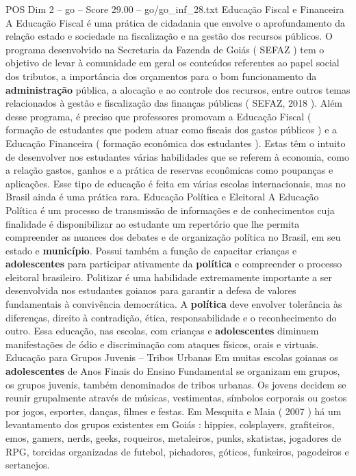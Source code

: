 \begin{textsample}{POS Dim 2 – go – Score 29.00 – go/go\_inf\_28.txt}
Educação Fiscal e Financeira A Educação Fiscal é uma prática de cidadania que envolve o aprofundamento da relação estado e sociedade na fiscalização e na gestão dos recursos públicos.
O programa desenvolvido na Secretaria da Fazenda de Goiás ( SEFAZ ) tem o objetivo de levar à comunidade em geral os conteúdos referentes ao papel social dos tributos, a importância dos orçamentos para o bom funcionamento da \textbf{administração} pública, a alocação e ao controle dos recursos, entre outros temas relacionados à gestão e fiscalização das finanças públicas ( SEFAZ, 2018 ).
Além desse programa, é preciso que professores promovam a Educação Fiscal ( formação de estudantes que podem atuar como fiscais dos gastos públicos ) e a Educação Financeira ( formação econômica dos estudantes ).
Estas têm o intuito de desenvolver nos estudantes várias habilidades que se referem à economia, como a relação gastos, ganhos e a prática de reservas econômicas como poupanças e aplicações.
Esse tipo de educação é feita em várias escolas internacionais, mas no Brasil ainda é uma prática rara.
Educação Política e Eleitoral A Educação Política é um processo de transmissão de informações e de conhecimentos cuja finalidade é disponibilizar ao estudante um repertório que lhe permita compreender as nuances dos debates e de organização política no Brasil, em seu estado e \textbf{município}.
Possui também a função de capacitar crianças e \textbf{adolescentes} para participar ativamente da \textbf{política} e compreender o processo eleitoral brasileiro.
Politizar é uma habilidade extremamente importante a ser desenvolvida nos estudantes goianos para garantir a defesa de valores fundamentais à convivência democrática.
A \textbf{política} deve envolver tolerância às diferenças, direito à contradição, ética, responsabilidade e o reconhecimento do outro.
Essa educação, nas escolas, com crianças e \textbf{adolescentes} diminuem manifestações de ódio e discriminação com ataques físicos, orais e virtuais.
Educação para Grupos Juvenis – Tribos Urbanas Em muitas escolas goianas os \textbf{adolescentes} de Anos Finais do Ensino Fundamental se organizam em grupos, os grupos juvenis, também denominados de tribos urbanas.
Os jovens decidem se reunir grupalmente através de músicas, vestimentas, símbolos corporais ou gostos por jogos, esportes, danças, filmes e festas.
Em Mesquita e Maia ( 2007 ) há um levantamento dos grupos existentes em Goiás : hippies, colsplayers, grafiteiros, emos, gamers, nerds, geeks, roqueiros, metaleiros, punks, skatistas, jogadores de RPG, torcidas organizadas de futebol, pichadores, góticos, funkeiros, pagodeiros e sertanejos.

\end{textsample}
